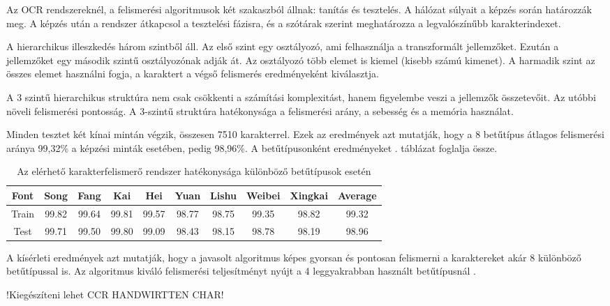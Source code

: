Az OCR rendszereknél, a felismerési algoritmusok két szakaszból állnak: tanítás és tesztelés. A hálózat súlyait a képzés során határozzák meg. A képzés után a rendszer átkapcsol a tesztelési fázisra, és a szótárak szerint meghatározza a legvalószínűbb karakterindexet.

A hierarchikus illeszkedés három szintből áll. Az első szint egy osztályozó, ami felhasználja a transzformált jellemzőket. Ezután a jellemzőket egy második szintű osztályozónak adják át. Az osztályozó több elemet is kiemel (kisebb számú kimenet). A harmadik szint az összes elemet használni fogja, a karaktert a végső felismerés eredményeként kiválasztja.

A 3 szintű hierarchikus struktúra nem csak csökkenti a számítási komplexitást, hanem figyelembe veszi a jellemzők összetevőit. Az utóbbi növeli felismerési pontosság. A 3-szintű struktúra hatékonysága a felismerési arány, a sebesség és a memória használat.

Minden tesztet két kínai mintán végzik, összesen 7510 karakterrel. Ezek az eredmények azt mutatják, hogy a 8 betűtípus átlagos felismerési aránya 99,32\% a képzési minták esetében, pedig 98,96\%. A betűtípusonként eredményeket . táblázat foglalja össze.

\begin{table}
\centering
\begin{tabular}{ |c|c|c|c|c|c|c|c|c|c|}
\hline
Font & Song & Fang & Kai & Hei & Yuan & Lishu & Weibei & Xingkai & Average\\
\hline
Train & 99.82 & 99.64 & 99.81 & 99.57 & 98.77 & 98.75 & 99.35 & 98.82 & 99.32\\
\hline
Test & 99.71 & 99.50 & 99.80 & 99.09 & 98.43 & 98.15 & 98.78 & 98.19 & 98.96\\
\hline
\end{tabular}
\caption{Az elérhető karakterfelismerő rendszer hatékonysága különböző betűtípusok esetén}
\label{tab:ccr_results}
\end{table}

A kísérleti eredmények azt mutatják, hogy a javasolt algoritmus képes gyorsan és pontosan felismerni a karaktereket akár 8 különböző betűtípussal is. Az algoritmus kiváló felismerési teljesítményt nyújt a 4 leggyakrabban használt betűtípusnál \cite{wu2002recognition}.


!Kiegészíteni lehet CCR HANDWIRTTEN CHAR!
